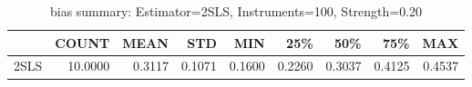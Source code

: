 \begin{table}[ht]
\centering
\caption{bias summary: Estimator=2SLS, Instruments=100, Strength=0.20}
\begin{tabular}{lrrrrrrrr}
\toprule
 & COUNT & MEAN & STD & MIN & 25\% & 50\% & 75\% & MAX \\
\midrule
2SLS & 10.0000 & 0.3117 & 0.1071 & 0.1600 & 0.2260 & 0.3037 & 0.4125 & 0.4537 \\
\bottomrule
\end{tabular}
\end{table}
